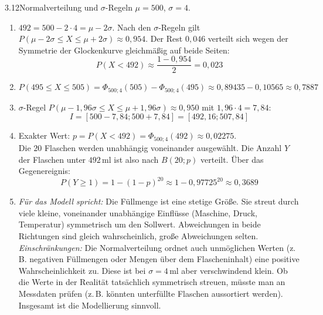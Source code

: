 \begin{loesung}{3.12}{Normalverteilung und \texorpdfstring{\(\sigma\)}{Sigma}-Regeln}
$\mu = 500$, $\sigma = 4$.
\begin{enumerate}[label=\alph*)]
  \item $492 = 500-2\cdot 4 = \mu-2\sigma$. Nach den $\sigma$-Regeln gilt $P(\mu-2\sigma\leq X\leq\mu+2\sigma)\approx 0{,}954$. Der Rest $0{,}046$ verteilt sich wegen der Symmetrie der Glockenkurve gleichmäßig auf beide Seiten:
  \[P(X<492)\approx\dfrac{1-0{,}954}{2} = 0{,}023\]
  \item \[P(495\leq X\leq 505) = \Phi_{500;4}(505)-\Phi_{500;4}(495)\approx 0{,}89435-0{,}10565\approx 0{,}7887\]
  \item $\sigma$-Regel $P(\mu-1{,}96\sigma\leq X\leq\mu+1{,}96\sigma)\approx 0{,}950$ mit $1{,}96\cdot 4 = 7{,}84$:
  \[I = [500-7{,}84;500+7{,}84] = [492{,}16;507{,}84]\]
  \item Exakter Wert: $p = P(X<492) = \Phi_{500;4}(492)\approx 0{,}02275$.\\
  Die $20$ Flaschen werden unabhängig voneinander ausgewählt. Die Anzahl $Y$ der Flaschen unter $492$\,ml ist also nach $B(20;p)$ verteilt. Über das Gegenereignis:
  \[P(Y\geq 1) = 1-(1-p)^{20}\approx 1-0{,}97725^{20}\approx 0{,}3689\]
  \item \textit{Für das Modell spricht:} Die Füllmenge ist eine stetige Größe. Sie streut durch viele kleine, voneinander unabhängige Einflüsse (Maschine, Druck, Temperatur) symmetrisch um den Sollwert. Abweichungen in beide Richtungen sind gleich wahrscheinlich, große Abweichungen selten.\\
  \textit{Einschränkungen:} Die Normalverteilung ordnet auch unmöglichen Werten (z.\,B. negativen Füllmengen oder Mengen über dem Flascheninhalt) eine positive Wahrscheinlichkeit zu. Diese ist bei $\sigma=4$\,ml aber verschwindend klein. Ob die Werte in der Realität tatsächlich symmetrisch streuen, müsste man an Messdaten prüfen (z.\,B. könnten unterfüllte Flaschen aussortiert werden). Insgesamt ist die Modellierung sinnvoll.
\end{enumerate}
\end{loesung}


